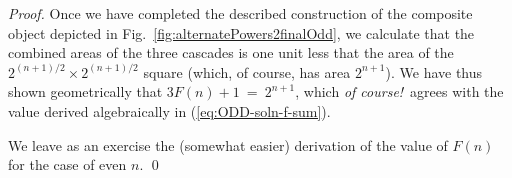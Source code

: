 \begin{proof}
Once we have completed the described construction of the composite
object depicted in Fig.~\ref{fig:alternatePowers2finalOdd}, we
calculate that the combined areas of the three cascades is one unit
less that the area of the $2^{(n+1)/2} \times 2^{(n+1)/2}$ square
(which, of course, has area $2^{n+1}$).  We have thus shown
geometrically that $3 F(n)+1 \ = \ 2^{n+1}$, which {\em of
  course!}~agrees with the value derived algebraically in
(\ref{eq:ODD-soln-f-sum}).

\bigskip

We leave as an exercise the (somewhat easier) derivation of the value
of $F(n)$ for the case of even $n$.
\qed
\end{proof}


%
%
%
%
%
%

